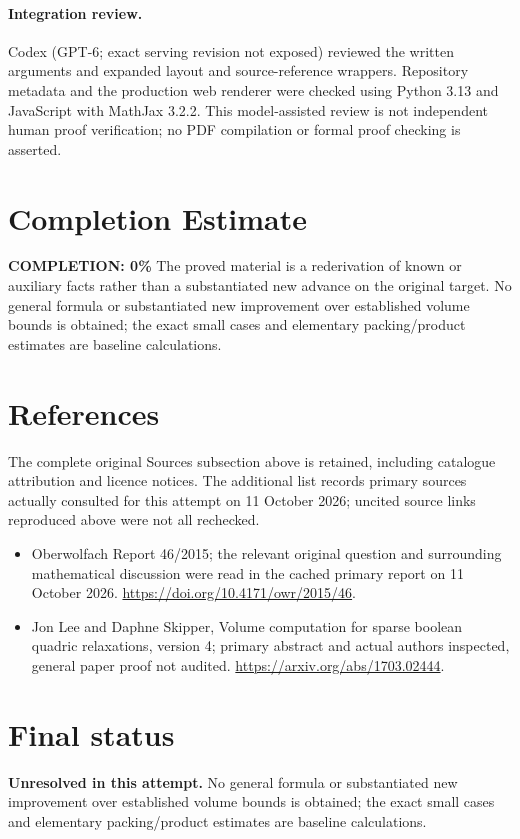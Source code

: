 \documentclass[11pt]{article}
\begin{document}
\paragraph{Integration review.} Codex (GPT-6; exact serving revision not exposed) reviewed the written arguments and expanded layout and source-reference wrappers. Repository metadata and the production web renderer were checked using Python 3.13 and JavaScript with MathJax 3.2.2. This model-assisted review is not independent human proof verification; no PDF compilation or formal proof checking is asserted.

\section{Completion Estimate}
\noindent\textbf{COMPLETION: 0\%}
The proved material is a rederivation of known or auxiliary facts rather than a substantiated new advance on the original target. No general formula or substantiated new improvement over established volume bounds is obtained; the exact small cases and elementary packing/product estimates are baseline calculations.
\section{References}
The complete original Sources subsection above is retained, including catalogue attribution and licence notices. The additional list records primary sources actually consulted for this attempt on 11 October 2026; uncited source links reproduced above were not all rechecked.
\begin{itemize}
\item Oberwolfach Report 46/2015; the relevant original question and surrounding mathematical discussion were read in the cached primary report on 11 October 2026. \url{https://doi.org/10.4171/owr/2015/46}.
\item Jon Lee and Daphne Skipper, Volume computation for sparse boolean quadric relaxations, version 4; primary abstract and actual authors inspected, general paper proof not audited. \url{https://arxiv.org/abs/1703.02444}.
\end{itemize}
\section{Final status}
\textbf{Unresolved in this attempt.} No general formula or substantiated new improvement over established volume bounds is obtained; the exact small cases and elementary packing/product estimates are baseline calculations.
\end{document}
